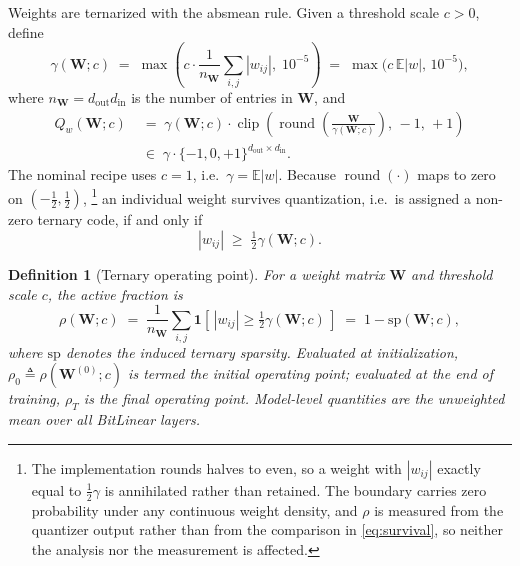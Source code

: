 \documentclass[final,5p,times,twocolumn]{elsarticle}
\newtheorem{definition}{Definition}
\theoremstyle{remark}
\newcommand{\E}{\mathbb{E}}
\newcommand{\Wm}{\mathbf{W}}
\newcommand{\rhoz}{\rho_{0}}
\newcommand{\clip}{\operatorname{clip}}
\newcommand{\round}{\operatorname{round}}
\begin{document}
Weights are ternarized with the absmean rule. Given a threshold scale
$c > 0$, define
\begin{equation}
\label{eq:gamma}
\gamma(\Wm; c) \;=\; \max\!\left(c \cdot \frac{1}{n_{\Wm}}\sum_{i,j}
|w_{ij}|,\; 10^{-5} \right)
\;=\; \max\big(c\,\E|w|,\,10^{-5}\big),
\end{equation}
where $n_{\Wm} = d_{\mathrm{out}}d_{\mathrm{in}}$ is the number of entries in $\Wm$, and
\begin{equation}
\label{eq:wquant}
\begin{aligned}
Q_{w}(\Wm; c) &\;=\; \gamma(\Wm;c)\cdot
\clip\!\left(\round\!\left(\frac{\Wm}{\gamma(\Wm;c)}\right),\,-1,\,+1\right)\\[0.4ex]
&\;\in\; \gamma \cdot \{-1,0,+1\}^{d_{\mathrm{out}}\times d_{\mathrm{in}}}.
\end{aligned}
\end{equation}
The nominal recipe uses $c = 1$, i.e.\ $\gamma = \E|w|$. Because
$\round(\cdot)$ maps to zero on $(-\tfrac{1}{2},\tfrac{1}{2})$,%
\footnote{The implementation rounds halves to even, so a weight with
$|w_{ij}|$ exactly equal to $\tfrac{1}{2}\gamma$ is annihilated rather than
retained. The boundary carries zero probability under any continuous weight
density, and $\rho$ is measured from the quantizer output rather than from
the comparison in \eqref{eq:survival}, so neither the analysis nor the
measurement is affected.}
an individual
weight survives quantization, i.e.\ is assigned a non-zero ternary code, if
and only if
\begin{equation}
\label{eq:survival}
|w_{ij}| \;\geq\; \tfrac{1}{2}\gamma(\Wm;c).
\end{equation}

\begin{definition}[Ternary operating point]
\label{def:oppoint}
For a weight matrix $\Wm$ and threshold scale $c$, the active fraction
is
\begin{equation}
\label{eq:rho}
\rho(\Wm; c) \;=\; \frac{1}{n_{\Wm}}
\sum_{i,j} \mathbf{1}\!\left[\,|w_{ij}| \geq \tfrac{1}{2}\gamma(\Wm;c)\,\right]
\;=\; 1 - \mathrm{sp}(\Wm;c),
\end{equation}
where $\mathrm{sp}$ denotes the induced ternary sparsity. Evaluated at
initialization, $\rhoz \triangleq \rho(\Wm^{(0)}; c)$ is termed the
initial operating point; evaluated at the end of training,
$\rho_{T}$ is the final operating point. Model-level quantities are the
unweighted mean over all BitLinear layers.
\end{definition}
\end{document}
